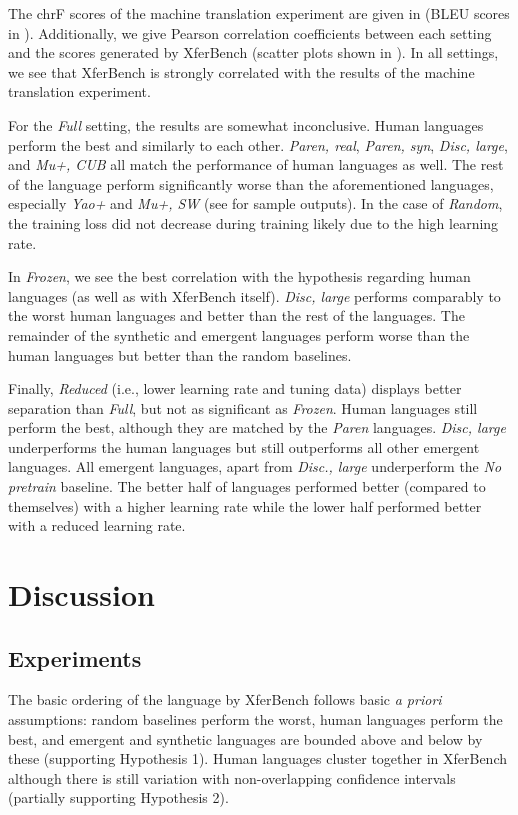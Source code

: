 The chrF scores of the machine translation experiment are given in  (BLEU scores in ).
Additionally, we give Pearson correlation coefficients between each setting and the scores generated by XferBench (scatter plots shown in ).
In all settings, we see that XferBench is strongly correlated with the results of the machine translation experiment.

For the \emph{Full} setting, the results are somewhat inconclusive.
Human languages perform the best and similarly to each other.
\emph{Paren, real},
  \emph{Paren, syn},
  \emph{Disc, large},
  and \emph{Mu+, CUB}
  all match the performance of human languages as well.
The rest of the language perform significantly worse than the aforementioned languages, especially \emph{Yao+} and \emph{Mu+, SW} (see  for sample outputs).
In the case of \emph{Random}, the training loss did not decrease during training likely due to the high learning rate.

In \emph{Frozen}, we see the best correlation with the hypothesis regarding human languages (as well as with XferBench itself).
\emph{Disc, large} performs comparably to the worst human languages and better than the rest of the languages.
The remainder of the synthetic and emergent languages perform worse than the human languages but better than the random baselines.

Finally, \emph{Reduced} (i.e., lower learning rate and tuning data) displays better separation than \emph{Full}, but not as significant as \emph{Frozen}.
Human languages still perform the best, although they are matched by the \emph{Paren} languages.
\emph{Disc, large} underperforms the human languages but still outperforms all other emergent languages.
All emergent languages, apart from \emph{Disc., large} underperform the \emph{No pretrain} baseline.
The better half of languages performed better (compared to themselves) with a higher learning rate while the lower half performed better with a reduced learning rate.


\section{Discussion}

\subsection{Experiments}

The basic ordering of the language by XferBench follows basic \emph{a priori} assumptions:
  random baselines perform the worst,
  human languages perform the best,
  and emergent and synthetic languages are bounded above and below by these
  (supporting Hypothesis 1).
Human languages cluster together in XferBench although there is still variation with non-overlapping confidence intervals (partially supporting Hypothesis 2).

